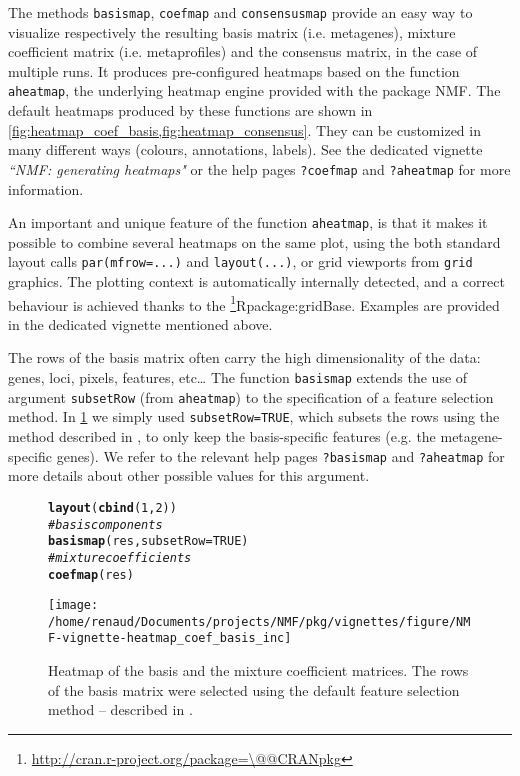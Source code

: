 \documentclass[a4paper]{article}\usepackage[]{graphicx}\usepackage[]{color}
\makeatletter
\def\maxwidth{ %
  \ifdim\Gin@nat@width>\linewidth
    \linewidth
  \else
    \Gin@nat@width
  \fi
}
\newcommand{\hlnum}[1]{\textcolor[rgb]{0.686,0.059,0.569}{#1}}%
\newcommand{\hlcom}[1]{\textcolor[rgb]{0.678,0.584,0.686}{\textit{#1}}}%
\newcommand{\hlstd}[1]{\textcolor[rgb]{0.345,0.345,0.345}{#1}}%
\newcommand{\hlkwc}[1]{\textcolor[rgb]{0.333,0.667,0.333}{#1}}%
\newcommand{\hlkwd}[1]{\textcolor[rgb]{0.737,0.353,0.396}{\textbf{#1}}}%
\newenvironment{kframe}{%
 \def\at@end@of@kframe{}%
 \ifinner\ifhmode%
  \def\at@end@of@kframe{\end{minipage}}%
  \begin{minipage}{\columnwidth}%
 \fi\fi%
 \def\FrameCommand##1{\hskip\@totalleftmargin \hskip-\fboxsep
 \colorbox{shadecolor}{##1}\hskip-\fboxsep
     \hskip-\linewidth \hskip-\@totalleftmargin \hskip\columnwidth}%
 \MakeFramed {\advance\hsize-\width
   \@totalleftmargin\z@ \linewidth\hsize
   \@setminipage}}%
 {\par\unskip\endMakeFramed%
 \at@end@of@kframe}
\newenvironment{knitrout}{}{} %
\let\code=\texttt
\newcommand{\pkgname}[1]{\textit{#1}\xspace}
\newcommand{\CRANurl}[1]{\url{http://cran.r-project.org/package=#1}}
\def\CRANpkg{\@ifstar\@CRANpkg\@@CRANpkg}
\def\@CRANpkg#1{\href{http://cran.r-project.org/package=#1}{\pkgname{#1}}\footnote{\CRANurl{#1}}}
\def\@@CRANpkg#1{\href{http://cran.r-project.org/package=#1}{\pkgname{#1}} package\footnote{\CRANurl{#1}}}
\def\citeCRANpkg{\@ifstar\@citeCRANpkg\@@citeCRANpkg}
\def\@citeCRANpkg#1{\CRANpkg{#1}\cite*{Rpackage:#1}}
\def\@@citeCRANpkg#1{\CRANpkg{#1}~\cite{Rpackage:#1}}
\renewcommand{\cite}[1]{\parencite{#1}}
\makeatother
\begin{document}
The methods \code{basismap}, \code{coefmap} and \code{consensusmap} provide an
easy way to visualize respectively the resulting basis matrix (i.e. metagenes),
mixture coefficient matrix (i.e. metaprofiles) and the consensus matrix, in the
case of multiple runs.
It produces pre-configured heatmaps based on the function \code{aheatmap}, the
underlying heatmap engine provided with the package NMF. 
The default heatmaps produced by these functions are shown in
\cref{fig:heatmap_coef_basis,fig:heatmap_consensus}.
They can be customized in many different ways (colours, annotations, labels).
See the dedicated vignette \emph{``NMF: generating heatmaps"} or the help pages
\code{?coefmap} and \code{?aheatmap} for more information.

An important and unique feature of the function \code{aheatmap}, is that it
makes it possible to combine several heatmaps on the same plot, using the both
standard layout calls \texttt{par(mfrow=...)} and \texttt{layout(...)}, or grid
viewports from \texttt{grid} graphics.
The plotting context is automatically internally detected, and a correct
behaviour is achieved thanks to the \citeCRANpkg{gridBase}.
Examples are provided in the dedicated vignette mentioned above.

The rows of the basis matrix often carry the high dimensionality of the data: genes, loci, pixels, features, etc\ldots 
The function \code{basismap} extends the use of argument \code{subsetRow} (from \code{aheatmap}) to the specification of a feature selection method.
In \cref{fig:heatmap_coef_basis} we simply used \code{subsetRow=TRUE}, which subsets the rows using the method described in \cite{KimH2007}, to only keep the basis-specific features (e.g. the metagene-specific genes). 
We refer to the relevant help pages \code{?basismap} and \code{?aheatmap} for more details about other possible values for this argument.

\begin{figure}[!htbp]
\centering
\begin{knitrout}
\color{fgcolor}\begin{kframe}
\begin{alltt}
\hlkwd{layout}\hlstd{(}\hlkwd{cbind}\hlstd{(}\hlnum{1}\hlstd{,} \hlnum{2}\hlstd{))}
\hlcom{# basis components}
\hlkwd{basismap}\hlstd{(res,} \hlkwc{subsetRow} \hlstd{=} \hlnum{TRUE}\hlstd{)}
\hlcom{# mixture coefficients}
\hlkwd{coefmap}\hlstd{(res)}
\end{alltt}
\end{kframe}
\texttt{[image: /home/renaud/Documents/projects/NMF/pkg/vignettes/figure/NMF-vignette-heatmap\_coef\_basis\_inc]} 

\end{knitrout}

\caption{Heatmap of the basis and the mixture coefficient matrices. The rows of the basis matrix were selected using the default feature selection method -- described in \cite{KimH2007}.}
\label{fig:heatmap_coef_basis}
\end{figure}
\end{document}

